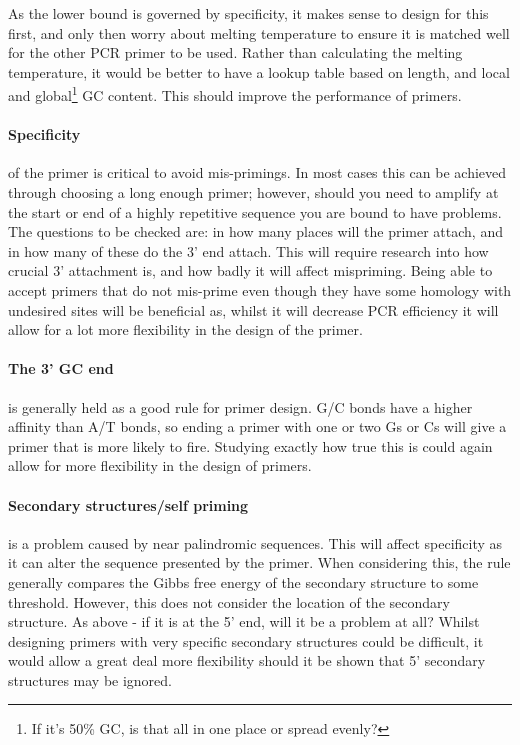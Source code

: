 \documentclass[../main.tex]{subfiles}
\begin{document}
As the lower bound is governed by specificity, it makes sense to design for this first, and only then worry about melting temperature to ensure it is matched well for the other PCR primer to be used. Rather than calculating the melting temperature, it would be better to have a lookup table based on length, and local and global\footnote{If it's 50\% GC, is that all in one place or spread evenly?} GC content. This should improve the performance of primers.

\paragraph{Specificity} of the primer is critical to avoid mis-primings. In most cases this can be achieved through choosing a long enough primer; however, should you need to amplify at the start or end of a highly repetitive sequence you are bound to have problems. The questions to be checked are: in how many places will the primer attach, and in how many of these do the 3' end attach. This will require research into how crucial 3' attachment is, and how badly it will affect mispriming. Being able to accept primers that do not mis-prime even though they have some homology with undesired sites will be beneficial as, whilst it will decrease PCR efficiency it will allow for a lot more flexibility in the design of the primer.

\paragraph{The 3' GC end} is generally held as a good rule for primer design. G/C bonds have a higher affinity than A/T bonds, so ending a primer with one or two Gs or Cs will give a primer that is more likely to fire. Studying exactly how true this is could again allow for more flexibility in the design of primers.

\paragraph{Secondary structures/self priming} is a problem caused by near palindromic sequences. This will affect specificity as it can alter the sequence presented by the primer. When considering this, the rule generally compares the Gibbs free energy of the secondary structure to some threshold. However, this does not consider the location of the secondary structure. As above - if it is at the 5' end, will it be a problem at all? Whilst designing primers with very specific secondary structures could be difficult, it would allow a great deal more flexibility should it be shown that 5' secondary structures may be ignored.
\end{document}
